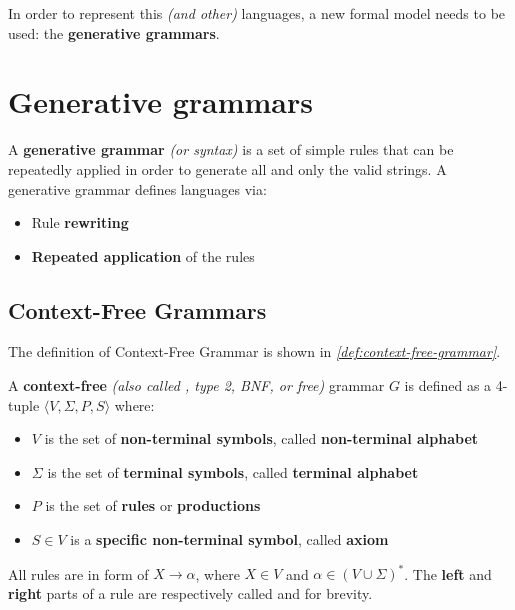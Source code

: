 \documentclass[english]{article}
\begin{document}
In order to represent this \textit{(and other)} languages, a new formal model needs to be used:
the \textbf{generative grammars}.

\clearpage

\section{Generative grammars}
\label{sec:generative-grammars}

A \textbf{generative grammar} \textit{(or syntax)} is a set of simple rules that can be repeatedly applied in order to generate all and only the valid strings.
A generative grammar defines languages via:

\begin{itemize}
  \item Rule \textbf{rewriting}
  \item \textbf{Repeated application} of the rules
\end{itemize}

\subsection{Context-Free Grammars}

The definition of Context-Free Grammar is shown in \textit{\ref{def:context-free-grammar}}.

\begin{definition}
  \label{def:context-free-grammar}
  A \textbf{context-free} \textit{(also called \CF, type 2, BNF, or free)} grammar \(G\) is defined as a 4-tuple \(\langle V, \Sigma, P, S\rangle\) where:

  \begin{itemize}
    \item \(V\) is the set of \textbf{non-terminal symbols}, called \textbf{non-terminal alphabet}
    \item \(\Sigma\) is the set of \textbf{terminal symbols}, called \textbf{terminal alphabet}
    \item \(P\) is the set of \textbf{rules} or \textbf{productions}
    \item \(S \in V\) is a \textbf{specific non-terminal symbol}, called \textbf{axiom}
  \end{itemize}

  All rules are in form of \(X \rightarrow \alpha\), where \(X \in V\) and \(\alpha \in (V \cup \Sigma)^\ast\).
  The \textbf{left} and \textbf{right} parts of a rule are respectively called \textbf{\LP} and \textbf{\RP} for brevity.
\end{definition}
\end{document}
